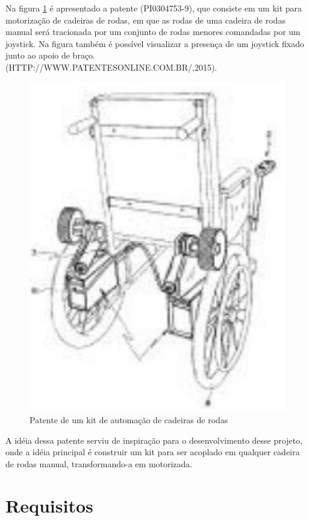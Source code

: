 Na figura \ref{fig:kit_motorizacao} é apresentado a patente (PI0304753-9), que consiste em um kit para motorização de cadeiras de rodas, em que as rodas de uma cadeira de rodas manual será tracionada por um conjunto de rodas menores comandadas por um joystick. Na figura também é possível visualizar a presença de um joystick fixado junto ao apoio de braço. (HTTP://WWW.PATENTESONLINE.COM.BR/,2015).

\begin{figure}[!htb]
  \centering
  \includegraphics[keepaspectratio=true,scale=0.50]{figuras/introducao/kit_motorizacao}
  \caption{Patente de um kit de automação de cadeiras de rodas}
  \label{fig:kit_motorizacao}
\end{figure}

A idéia dessa patente serviu de inspiração para o desenvolvimento desse projeto, onde a idéia principal é construir um kit para ser acoplado em qualquer cadeira de rodas manual, transformando-a em motorizada.

\section{Requisitos}

